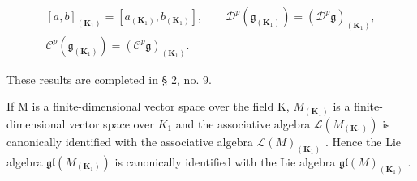 \[
\begin{array}{c} [ a, b ] _ {(\mathbf {K} _ {1})} = [ a _ {(\mathbf {K} _ {1})}, b _ {(\mathbf {K} _ {1})} ], \qquad \mathcal {D} ^ {p} (\mathfrak {g} _ {(\mathbf {K} _ {1})}) = (\mathcal {D} ^ {p} \mathfrak {g}) _ {(\mathbf {K} _ {1})}, \\ \mathcal {C} ^ {p} (\mathfrak {g} _ {(\mathbf {K} _ {1})}) = (\mathcal {C} ^ {p} \mathfrak {g}) _ {(\mathbf {K} _ {1})}. \end{array}
\]

These results are completed in § 2, no. 9.

If M is a finite-dimensional vector space over the field K, \(M_{(\mathbf{K}_{1})}\) is a finite-dimensional vector space over \(K_{1}\) and the associative algebra \(\mathcal{L}(M_{(\mathbf{K}_{1})})\) is canonically identified with the associative algebra \(\mathcal{L}(M)_{(\mathbf{K}_{1})}\) . Hence the Lie algebra \(\mathfrak{gl}(M_{(\mathbf{K}_{1})})\) is canonically identified with the Lie algebra \(\mathfrak{gl}(M)_{(\mathbf{K}_{1})}\) .

